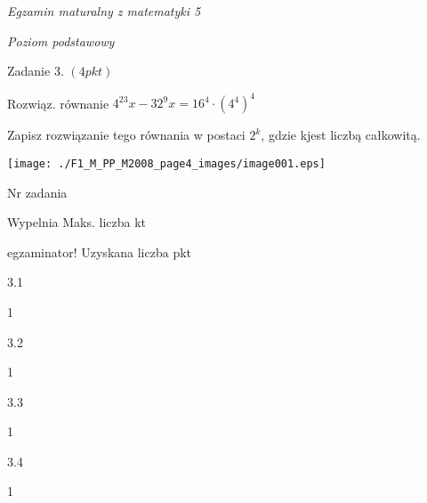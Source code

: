 \documentclass[a4paper,12pt]{article}
\begin{document}
{\it Egzamin maturalny z matematyki 5}

{\it Poziom podstawowy}

Zadanie 3. $(4pkt)$

Rozwiąz. równanie $4^{23}x-32^{9}x=16^{4}\cdot(4^{4})^{4}$

Zapisz rozwiązanie tego równania w postaci $2^{k}$, gdzie kjest liczbą całkowitą.
\begin{center}
\texttt{[image: ./F1\_M\_PP\_M2008\_page4\_images/image001.eps]}
\end{center}
Nr zadania

Wypelnia Maks. liczba kt

egzaminator! Uzyskana liczba pkt

3.1

1

3.2

1

3.3

1

3.4

1
\end{document}

